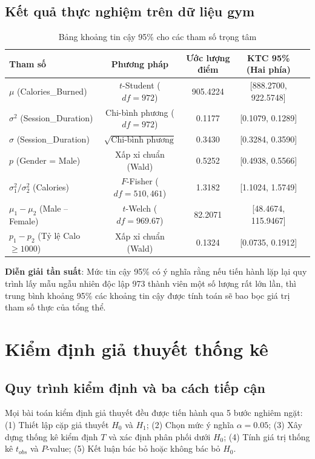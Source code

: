 \documentclass[12pt,a4paper]{report}
\begin{document}
\section{Kết quả thực nghiệm trên dữ liệu gym}
\begin{table}[htbp]
\centering\small
\caption{Bảng khoảng tin cậy 95\% cho các tham số trọng tâm}
\begin{tabular}{lcccc}
\toprule
\textbf{Tham số} & \textbf{Phương pháp} & \textbf{Ước lượng điểm} & \textbf{KTC 95\% (Hai phía)} \\
\midrule
$\mu$ (Calories\_Burned) & $t$-Student ($df=972$) & 905.4224 & [888.2700, 922.5748] \\
$\sigma^2$ (Session\_Duration) & Chi-bình phương ($df=972$) & 0.1177 & [0.1079, 0.1289] \\
$\sigma$ (Session\_Duration) & $\sqrt{\text{Chi-bình phương}}$ & 0.3430 & [0.3284, 0.3590] \\
$p$ (Gender = Male) & Xấp xỉ chuẩn (Wald) & 0.5252 & [0.4938, 0.5566] \\
$\sigma_1^2 / \sigma_2^2$ (Calories) & $F$-Fisher ($df=510, 461$) & 1.3182 & [1.1024, 1.5749] \\
$\mu_1 - \mu_2$ (Male -- Female) & $t$-Welch ($df=969.67$) & 82.2071 & [48.4674, 115.9467] \\
$p_1 - p_2$ (Tỷ lệ Calo $\ge 1000$) & Xấp xỉ chuẩn (Wald) & 0.1324 & [0.0735, 0.1912] \\
\bottomrule
\end{tabular}
\end{table}

\textbf{Diễn giải tần suất}: Mức tin cậy 95\% có ý nghĩa rằng nếu tiến hành lặp lại quy trình lấy mẫu ngẫu nhiên độc lập 973 thành viên một số lượng rất lớn lần, thì trung bình khoảng 95\% các khoảng tin cậy được tính toán sẽ bao bọc giá trị tham số thực của tổng thể.

\chapter{Kiểm định giả thuyết thống kê}
\section{Quy trình kiểm định và ba cách tiếp cận}
Mọi bài toán kiểm định giả thuyết đều được tiến hành qua 5 bước nghiêm ngặt:
(1) Thiết lập cặp giả thuyết $H_0$ và $H_1$; (2) Chọn mức ý nghĩa $\alpha = 0.05$; (3) Xây dựng thống kê kiểm định $T$ và xác định phân phối dưới $H_0$; (4) Tính giá trị thống kê $t_{obs}$ và $P$-value; (5) Kết luận bác bỏ hoặc không bác bỏ $H_0$.
\end{document}

